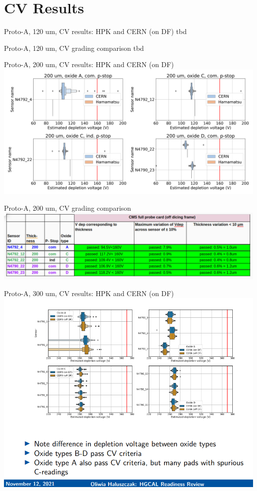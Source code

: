 \documentclass{beamer}
\begin{document}
\section{CV Results}

\begin{frame}{Proto-A, 120 um, CV results: HPK and CERN (on DF)}
  tbd
\end{frame}

\begin{frame}{Proto-A, 120 um, CV grading comparison}
  tbd
\end{frame}

\begin{frame}{Proto-A, 200 um, CV results: HPK and CERN (on DF)}
  \includegraphics[width=.8\textwidth]{plots/CV_ComparisonHPK_200um.png}
\end{frame}

\begin{frame}{Proto-A, 200 um, CV grading comparison}
  \includegraphics[width=.7\textwidth]{plots/CV_grading_200um.png}
\end{frame}

\begin{frame}{Proto-A, 300 um, CV results: HPK and CERN (on DF)}
  \includegraphics[width=.8\textwidth]{plots/CV_CERN_HPK_300um.png}
\end{frame}
\end{document}

